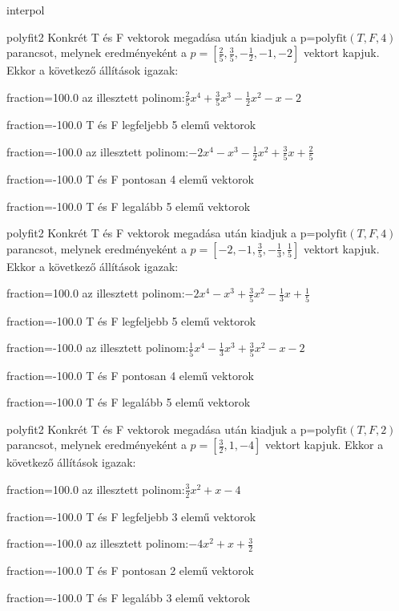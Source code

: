 \documentclass[12pt]{article}
\begin{document}
\begin{quiz}{interpol}
\begin{multi}[multiple]{polyfit2}
Konkrét T és F vektorok megadása után kiadjuk a p=$\mathrm{polyfit}(T,F,4)$
parancsot, melynek eredményeként a $p=\left[\frac{2}{5},\frac{3}{5},-\frac{1}{2},-1,-2\right]$ vektort kapjuk.
Ekkor a következő állítások igazak:
\item[fraction=100.0] az illesztett polinom:$\frac{2}{5}x^4+\frac{3}{5}x^3-\frac{1}{2}x^2-x-2$
\item[fraction=-100.0]  T és F legfeljebb 5 elemű vektorok
\item[fraction=-100.0]  az illesztett polinom:$-2x^4-x^3-\frac{1}{2}x^2+\frac{3}{5}x+\frac{2}{5}$
\item[fraction=-100.0]  T és F pontosan 4 elemű vektorok
\item[fraction=-100.0] T és F legalább 5 elemű vektorok
\end{multi}
\begin{multi}[multiple]{polyfit2}
Konkrét T és F vektorok megadása után kiadjuk a p=$\mathrm{polyfit}(T,F,4)$
parancsot, melynek eredményeként a $p=\left[-2,-1,\frac{3}{5},-\frac{1}{3},\frac{1}{5}\right]$ vektort kapjuk.
Ekkor a következő állítások igazak:
\item[fraction=100.0] az illesztett polinom:$-2x^4-x^3+\frac{3}{5}x^2-\frac{1}{3}x+\frac{1}{5}$
\item[fraction=-100.0]  T és F legfeljebb 5 elemű vektorok
\item[fraction=-100.0]  az illesztett polinom:$\frac{1}{5}x^4-\frac{1}{3}x^3+\frac{3}{5}x^2-x-2$
\item[fraction=-100.0]  T és F pontosan 4 elemű vektorok
\item[fraction=-100.0] T és F legalább 5 elemű vektorok
\end{multi}
\begin{multi}[multiple]{polyfit2}
Konkrét T és F vektorok megadása után kiadjuk a p=$\mathrm{polyfit}(T,F,2)$
parancsot, melynek eredményeként a $p=\left[\frac{3}{2},1,-4\right]$ vektort kapjuk.
Ekkor a következő állítások igazak:
\item[fraction=100.0] az illesztett polinom:$\frac{3}{2}x^2+x-4$
\item[fraction=-100.0]  T és F legfeljebb 3 elemű vektorok
\item[fraction=-100.0]  az illesztett polinom:$-4x^2+x+\frac{3}{2}$
\item[fraction=-100.0]  T és F pontosan 2 elemű vektorok
\item[fraction=-100.0] T és F legalább 3 elemű vektorok
\end{multi}
\end{quiz}
\end{document}
